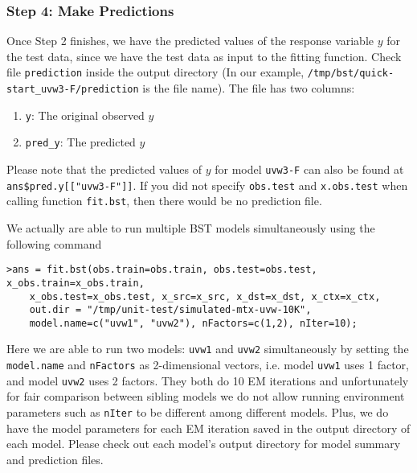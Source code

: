 \subsubsection{Step 4: Make Predictions}

Once Step 2 finishes, we have the predicted values of the response variable $y$ for the test data, since we have the test data as input to the fitting function. Check file {\tt prediction} inside the output directory (In our example, {\tt /tmp/bst/quick-start_uvw3-F/prediction} is the file name). The file has two columns: 
\begin{enumerate}
\item {\tt y}: The original observed $y$
\item {\tt pred_y}: The predicted $y$
\end{enumerate}
Please note that the predicted values of $y$ for model {\tt uvw3-F} can also be found at {\tt ans\$pred.y[["uvw3-F"]]}.
If you did not specify {\tt obs.test} and {\tt x.obs.test} when calling function {\tt fit.bst}, then there would be no prediction file.



We actually are able to run multiple BST models simultaneously using the following command
{\small\begin{verbatim}
>ans = fit.bst(obs.train=obs.train, obs.test=obs.test, x_obs.train=x_obs.train, 
	x_obs.test=x_obs.test, x_src=x_src, x_dst=x_dst, x_ctx=x_ctx,
	out.dir = "/tmp/unit-test/simulated-mtx-uvw-10K", 
	model.name=c("uvw1", "uvw2"), nFactors=c(1,2), nIter=10);
\end{verbatim}}
Here we are able to run two models: {\tt uvw1} and {\tt uvw2} simultaneously by setting the {\tt model.name} and {\tt nFactors} as  2-dimensional vectors, i.e. model {\tt uvw1} uses 1 factor, and model {\tt uvw2} uses 2 factors. They both do 10 EM iterations and unfortunately for fair comparison between sibling models we do not allow running environment parameters such as {\tt nIter} to be different among different models. Plus, we do have the model parameters for each EM iteration saved in the output directory of each model. Please check out each model's output directory for model summary and prediction files.


